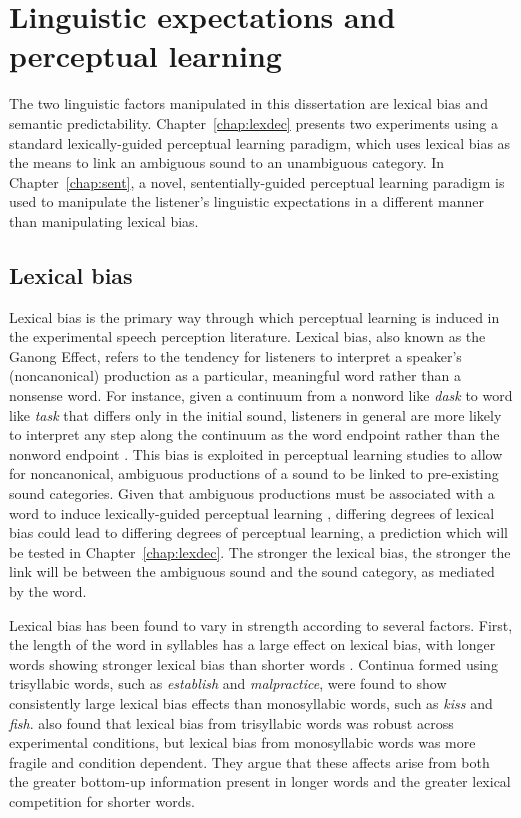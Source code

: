 \section{Linguistic expectations and perceptual learning}
\label{sec:linguistic}

The two linguistic factors manipulated in this dissertation are lexical bias and semantic predictability.  
Chapter~\ref{chap:lexdec} presents two experiments using a standard lexically-guided perceptual learning paradigm, which uses lexical bias as the means to link an ambiguous sound to an unambiguous category.
In Chapter~\ref{chap:sent}, a novel, sententially-guided perceptual learning paradigm is used to manipulate the listener's linguistic expectations in a different manner than manipulating lexical bias.

\subsection{Lexical bias}
\label{sec:lexicalbias}

Lexical bias is the primary way through which perceptual learning is induced in the experimental speech perception literature.
Lexical bias, also known as the Ganong Effect, refers to the tendency for listeners to interpret a speaker's (noncanonical) production as a particular, meaningful word rather than a nonsense word.  
For instance, given a continuum from a nonword like \emph{dask} to word like \emph{task} that differs only in the initial sound, listeners in general are more likely to interpret any step along the continuum as the word endpoint rather than the nonword endpoint \citep{Ganong1980}. 
This bias is exploited in perceptual learning studies to allow for noncanonical, ambiguous productions of a sound to be linked to pre-existing sound categories.
Given that ambiguous productions must be associated with a word to induce lexically-guided perceptual learning \citep{Norris2003}, differing degrees of lexical bias could lead to differing degrees of perceptual learning, a prediction which will be tested in Chapter~\ref{chap:lexdec}.  
The stronger the lexical bias, the stronger the link will be between the ambiguous sound and the sound category, as mediated by the word.

Lexical bias has been found to vary in strength according to several factors.  
First, the length of the word in syllables has a large effect on lexical bias, with longer words showing stronger lexical bias than shorter words \citep{Pitt2006}.  
Continua formed using trisyllabic words, such as \emph{establish} and \emph{malpractice}, were found to show consistently large lexical bias effects than monosyllabic words, such as \emph{kiss} and \emph{fish}.  
\citet{Pitt2006} also found that lexical bias from trisyllabic words was robust across experimental conditions, but lexical bias from monosyllabic words was more fragile and condition dependent.  
They argue that these affects arise from both the greater bottom-up information present in longer words and the greater lexical competition for shorter words.

